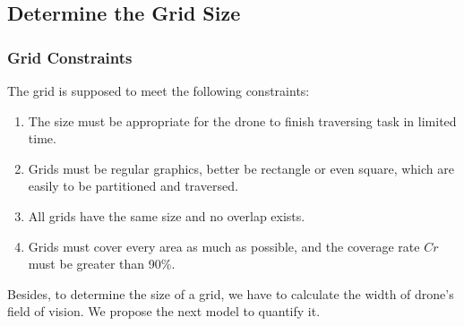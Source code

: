 \documentclass{mcmthesis}
\begin{document}
    \subsection{Determine the Grid Size}  
    \subsubsection{Grid Constraints} 
    The grid is supposed to meet the following constraints:
    	\begin{enumerate}
    		\item The size must be appropriate for the drone to finish traversing task in limited time.  
    		\item Grids must be regular graphics, better be rectangle or even square, which are easily to be partitioned and traversed. 
    		\item All grids have the same size and no overlap exists.
    		\item Grids must cover every area as much as possible, and the coverage rate $Cr$ must be greater than 90\%. 
    		
    	\end{enumerate} 
    \par
   	 Besides, to determine the size of a grid, we have to calculate the width of drone's field of vision. We propose the next model to quantify it.
  
\end{document}

